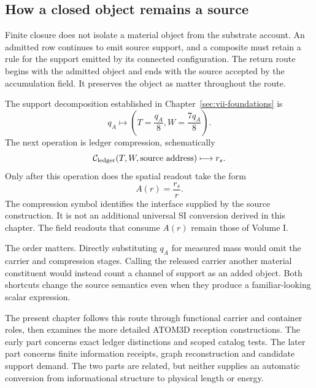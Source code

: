 \label{sec:vii-carriers}

\subsection{How a closed object remains a source}

Finite closure does not isolate a material object from the substrate account. An admitted row continues to emit source support, and a composite must retain a rule for the support emitted by its connected configuration. The return route begins with the admitted object and ends with the source accepted by the accumulation field. It preserves the object as matter throughout the route.

The support decomposition established in Chapter~\ref{sec:vii-foundations} is
\begin{equation}
q_A\longmapsto
\left(T=\frac{q_A}{8},W=\frac{7q_A}{8}\right).
\end{equation}
The next operation is ledger compression, schematically
\begin{equation}
\mathcal C_{\rm ledger}(T,W,\text{source address})
\longmapsto r_s.
\end{equation}
Only after this operation does the spatial readout take the form
\begin{equation}
A(r)=\frac{r_s}{r}.
\end{equation}
The compression symbol identifies the interface supplied by the source construction. It is not an additional universal SI conversion derived in this chapter. The field readouts that consume $A(r)$ remain those of Volume I.\cite{viisama,viispine}

The order matters. Directly substituting $q_A$ for measured mass would omit the carrier and compression stages. Calling the released carrier another material constituent would instead count a channel of support as an added object. Both shortcuts change the source semantics even when they produce a familiar-looking scalar expression.

The present chapter follows this route through functional carrier and container roles, then examines the more detailed ATOM3D reception constructions. The early part concerns exact ledger distinctions and scoped catalog tests. The later part concerns finite information receipts, graph reconstruction and candidate support demand. The two parts are related, but neither supplies an automatic conversion from informational structure to physical length or energy.

